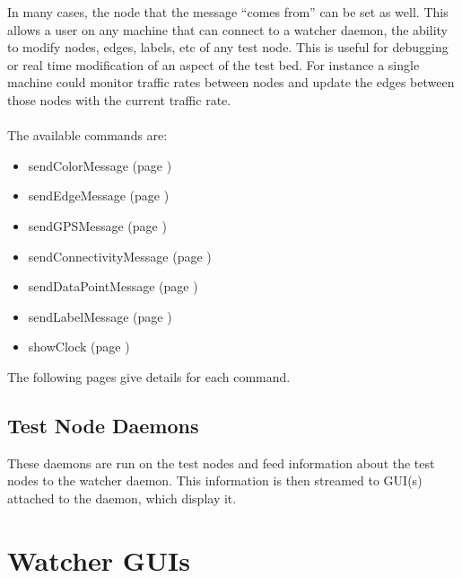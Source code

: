 \documentclass{article}
\begin{document}
In many cases, the node that the message ``comes from'' can be set as well. This allows a user on any machine that can connect to a watcher daemon, the ability to modify nodes, edges, labels, etc of any 
test node. This is useful for debugging or real time modification of an aspect of the test bed. For instance a single machine could monitor traffic rates between nodes and update 
the edges between those nodes with the current traffic rate. 
\\\\
The available commands are:
\begin{itemize}
\item sendColorMessage (page \pageref{sendColorMessage})
\item sendEdgeMessage (page \pageref{sendEdgeMessage})
\item sendGPSMessage (page \pageref{sendGPSMessage})
\item sendConnectivityMessage (page \pageref{sendConnectivityMessage})
\item sendDataPointMessage (page \pageref{sendDataPointMessage})
\item sendLabelMessage (page \pageref{sendLabelMessage})
\item showClock (page \pageref{showClock})
\end{itemize}
The following pages give details for each command.








\subsection{Test Node Daemons}
These daemons are run on the test nodes and feed information about the test nodes to the watcher daemon. This information is then streamed to GUI(s) attached to the daemon, which display it.





\section{Watcher GUIs}
\end{document}
